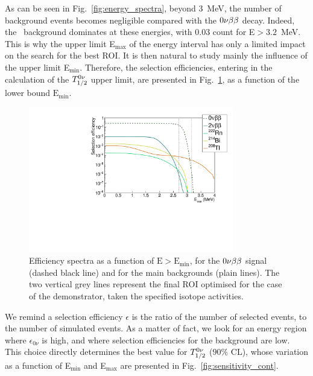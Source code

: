 As can be seen in Fig.~\ref{fig:energy_spectra}, beyond $3$~MeV, the number of background events becomes negligible compared with the $0\nu\beta\beta$ decay.
Indeed, the \Tl\ background dominates at these energies, with $0.03$ count for E$>3.2$~MeV.
This is why the upper limit E$_{\text{max}}$ of the energy interval has only a limited impact on the search for the best ROI.
It is then natural to study mainly the influence of the upper limit E$_{\text{min}}$.
Therefore, the selection efficiencies, entering in the calculation of the $T_{1/2}^{0\nu}$ upper limit, are presented in Fig.~\ref{fig:efficiency_spectra}, as a function of the lower bound $\text{E}_{\text{min}}$.
\begin{figure}[h!]
  \centering
  \includegraphics[width=0.8\textwidth]{Sensitivity/fig_sensitivity/efficiency_spectrum_with_B_82Se.pdf}
  \caption{Efficiency spectra as a function of $\text{E}>\text{E}_{\text{min}}$, for the $0\nu\beta\beta$ signal (dashed black line) and for the main backgrounds (plain lines).
    The two vertical grey lines represent the final ROI optimised for the case of the demonstrator, taken the specified isotope activities.
    \label{fig:efficiency_spectra}}
\end{figure}
We remind a selection efficiency $\epsilon$ is the ratio of the number of selected events, to the number of simulated events.
As a matter of fact, we look for an energy region where $\epsilon_{0\nu}$ is high, and where selection efficiencies for the background are low.
This choice directly determines the best value for $T_{1/2}^{0\nu}$ ($90\%$ CL), whose variation as a function of E$_{\text{min}}$ and E$_{\text{max}}$ are presented in Fig.~\ref{fig:sensitivity_cont}.
